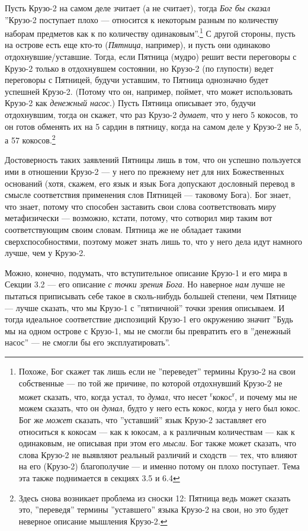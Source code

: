\documentclass[11pt]{book}
\begin{document}
Пусть Крузо-2 на самом деле зчитает (а не считает), тогда \textit{Бог бы сказал} ''Крузо-2 поступает плохо --- относится к некоторым разным по количеству наборам предметов как к по количеству одинаковым''.\footnote{Похоже, Бог скажет так лишь если не ''переведет'' термины Крузо-2 на свои собственные --- по той же причине, по которой отдохнувший Крузо-2 не может сказать, что, когда устал, то \textit{думал}, что несет \textsuperscript{r}кокос\textsuperscript{r}, и почему мы не можем сказать, что он \textit{думал}, будто у него есть кокос, когда у него был юкос. Бог же \textit{может} сказать, что ''уставший'' язык Крузо-2 заставляет его относиться к кокосам --- как к юкосам, а к различным количествам --- как к одинаковым, не описывая при этом его \textit{мысли}. Бог также может сказать, что слова Крузо-2 не выявляют реальный различий и сходств --- тех, что влияют на его (Крузо-2) благополучие --- и именно потому он плохо поступает. Тема эта также поднимается в секциях 3.5 и 6.4} С другой стороны, пусть на острове есть еще кто-то (\textit{Пятница}, например), и пусть они одинаково отдохнувшие/уставшие. Тогда, если Пятница (мудро) решит вести переговоры с Крузо-2 только в отдохнувшем состоянии, но Крузо-2 (по глупости) ведет переговоры с Пятницей, будучи уставшим, то Пятница однозначно будет успешней Крузо-2. (Потому что он, например, поймет, что может использовать Крузо-2 как \textit{денежный насос}.) Пусть Пятница описывает это, будучи отдохнувшим, тогда он скажет, что раз Крузо-2 \textit{думает}, что у него 5 кокосов, то он готов обменять их на 5 сардин в пятницу, когда на самом деле у Крузо-2 не 5, а 57 кокосов.\footnote{Здесь снова возникает проблема из сноски 12: Пятница ведь может сказать это, ''переведя'' термины ''уставшего'' языка Крузо-2 на свои, но это будет неверное описание мышления Крузо-2.}

Достоверность таких заявлений Пятницы лишь в том, что он успешно пользуется ими в отношении Крузо-2 --- у него по прежнему нет для них Божественных оснований (хотя, скажем, его язык и язык Бога допускают дословный перевод в смысле соответствия применения слов Пятницей --- таковому Бога). Бог знает, что знает, потому что способен заставить свои слова соответствовать миру метафизически --- возможно, кстати, потому, что сотворил мир таким вот соответствующим своим словам. Пятница же не обладает такими сверхспособностями, поэтому может знать лишь то, что у него дела идут намного лучше, чем у Крузо-2.

Можно, конечно, подумать, что вступительное описание Крузо-1 и его мира в Секции 3.2 --- его описание \textit{с точки зрения Бога}. Но наверное \textit{нам} лучше не пытаться приписывать себе такое в сколь-нибудь большей степени, чем Пятнице --- лучше сказать, что мы Крузо-1 с ''пятничной'' точки зрения описываем. И тогда идеальное соответствие диспозиций Крузо-1 его окружению значит ''Будь мы на одном острове с Крузо-1, мы не смогли бы превратить его в ''денежный насос'' --- не смогли бы его эксплуатировать''.
\end{document}
